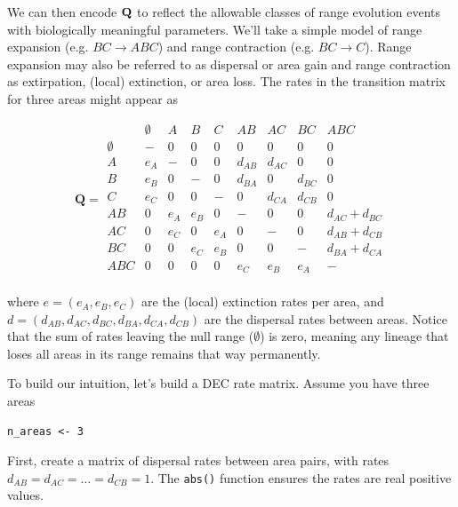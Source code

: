 We can then encode ${\bf Q}$ to reflect the allowable classes of range evolution events with biologically meaningful parameters.
We'll take a simple model of range expansion (e.g. $BC \rightarrow ABC$) and range contraction (e.g. $BC \rightarrow C$).
Range expansion may also be referred to as dispersal or area gain and range contraction as extirpation, (local) extinction, or area loss.
The rates in the transition matrix for three areas might appear as

\[
\textbf{Q} = 
	\begin{array}{c|cccccccc}
		& \emptyset & A & B & C & AB & AC & BC & ABC \\
		\hline
		\emptyset 	& - 	& 0 	& 0 	& 0 		& 0			& 0 		& 0 		& 0 \\
		A 			& e_A 	& - 	& 0 	& 0 		& d_{AB}	& d_{AC} 	& 0 		& 0 \\
		B 			& e_B 	& 0 	& - 	& 0 		& d_{BA}	& 0 		& d_{BC} 	& 0 \\
		C 			& e_C 	& 0 	& 0 	& - 		& 0 		& d_{CA} 	& d_{CB} 	& 0 \\
		AB 			& 0 	& e_A 	& e_B 	& 0 		& -			& 0 		& 0 		& d_{AC} + d_{BC} \\
		AC 			& 0 	& e_C 	& 0 	& e_A 		& 0			& - 		& 0 		& d_{AB} + d_{CB} \\
		BC 			& 0 	& 0 	& e_C 	& e_B 		& 0			& 0 		& - 		& d_{BA} + d_{CA} \\
		ABC 		& 0 	& 0 	& 0 	& 0 		& e_C 		& e_B 		& e_A 		& - \\								
	\end{array}
\]

where $e = ( e_A, e_B, e_C )$ are the (local) extinction rates per area, and $d = ( d_{AB}, d_{AC}, d_{BC}, d_{BA}, d_{CA}, d_{CB})$ are the dispersal rates between areas.
Notice that the sum of rates leaving the null range ($\emptyset$) is zero, meaning any lineage that loses all areas in its range remains that way permanently.

To build our intuition, let's build a DEC rate matrix.
Assume you have three areas

\begin{snugshade}
\begin{lstlisting}
n_areas <- 3
\end{lstlisting}
\end{snugshade}

First, create a matrix of dispersal rates between area pairs, with rates $d_{AB} = d_{AC} = \ldots = d_{CB} = 1$. The {\tt abs()} function ensures the rates are real positive values.

